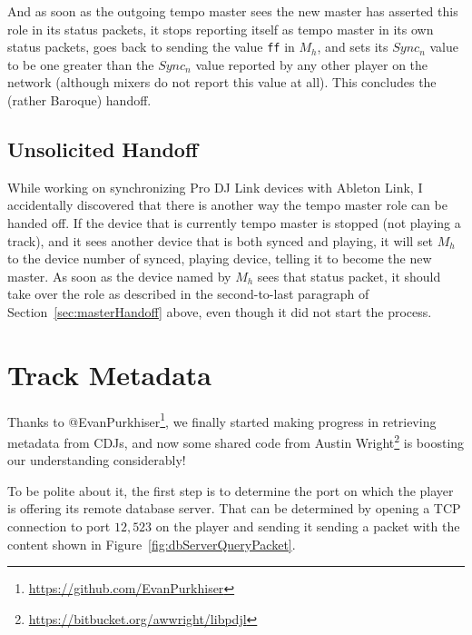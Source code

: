\documentclass[11pt]{article}
\begin{document}
And as soon as the outgoing tempo master sees the new master has
asserted this role in its status packets, it stops reporting itself as
tempo master in its own status packets, goes back to sending the value
{\tt ff} in $M_h$, and sets its $Sync_n$ value to be one greater than
the $Sync_n$ value reported by any other player on the network
(although mixers do not report this value at all). This concludes the
(rather Baroque) handoff.

\subsection{Unsolicited Handoff}

While working on synchronizing Pro DJ Link devices with Ableton Link,
I accidentally discovered that there is another way the tempo master
role can be handed off. If the device that is currently tempo master
is stopped (not playing a track), and it sees another device that is
both synced and playing, it will set $M_h$ to the device number of
synced, playing device, telling it to become the new master. As soon
as the device named by $M_h$ sees that status packet, it should take
over the role as described in the second-to-last paragraph of
Section~\ref{sec:masterHandoff} above, even though it did not start
the process.

\section{Track Metadata}
\label{sec:metadata}

Thanks to
@EvanPurkhiser\footnote{\url{https://github.com/EvanPurkhiser}}, we
finally started making progress in retrieving metadata from CDJs, and
now some shared code from Austin
Wright\footnote{\url{https://bitbucket.org/awwright/libpdjl}} is
boosting our understanding considerably!

To be polite about it, the first step is to determine the port on
which the player is offering its remote database server. That can be
determined by opening a TCP connection to port $12,523$ on the player
and sending it sending a packet with the content shown in
Figure~\ref{fig:dbServerQueryPacket}.
\end{document}
